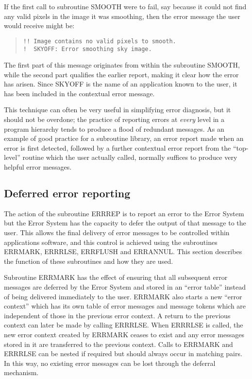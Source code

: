 \documentclass[twoside,11pt]{article}
\newcommand{\xlabel}[1]{}
\renewcommand{\_}{\texttt{\symbol{95}}}
\begin{document}
If the first call to subroutine SMOOTH were to fail, say because it could not 
find any valid pixels in the image it was smoothing, then the error message 
the user would receive might be:

\begin {quote}
\begin {small}
\begin{verbatim}
!! Image contains no valid pixels to smooth.
!  SKYOFF: Error smoothing sky image.
\end{verbatim}
\end {small}
\end {quote}

The first part of this message originates from within the subroutine SMOOTH, 
while the second part qualifies the earlier report, making it clear how the 
error has arisen.
Since SKYOFF is the name of an application known to the user, it has been 
included in the contextual error message.

This technique can often be very useful in simplifying error diagnosis, but
it should not be overdone; the practice of reporting errors at \emph{every}
level in a program hierarchy tends to produce a flood of redundant messages.
As an example of good practice for a subroutine library, an error report made 
when an error is first detected, followed by a further contextual error report 
from the ``top-level'' routine which the user actually called, normally
suffices to produce very helpful error messages. 


\subsection{\xlabel{deferred_error_reporting}Deferred error reporting \label{errdef_sect}}

The action of the subroutine ERR\_REP is to report an error to the 
Error System but the Error System has the capacity to defer the output of
that message to the user.
This allows the final delivery of error messages to be controlled within
applications software, and this control is achieved using the subroutines
ERR\_MARK, ERR\_RLSE, ERR\_FLUSH and ERR\_ANNUL. 
This section describes the function of these subroutines and how they are
used.

Subroutine ERR\_MARK has the effect of ensuring that all subsequent error 
messages are deferred by the Error System and stored in an ``error table''
instead of being delivered immediately to the user.
ERR\_MARK also starts a new ``error context'' which has its own table of error
messages and message tokens which are independent of those in the previous
error context.
A return to the previous context can later be made by calling ERR\_RLSE.
When ERR\_RLSE is called, the new error context created by ERR\_MARK ceases
to exist and any error messages stored in it are transferred to the
previous context. 
Calls to ERR\_MARK and ERR\_RLSE can be nested if required but should always 
occur in matching pairs.
In this way, no existing error messages can be lost through the deferral 
mechanism.
\end{document}
